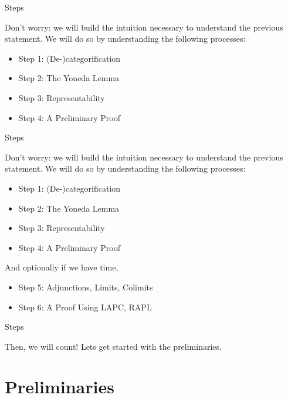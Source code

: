 \documentclass[tikz]{beamer}
\theoremstyle{definition}
\begin{document}
\begin{frame}{Steps}
    
    Don't worry: we will build the intuition necessary to understand the 
    previous statement. We will do so by understanding the following processes:
    
\begin{itemize}
    \item Step 1: (De-)categorification
    \item Step 2: The Yoneda Lemma
    \item Step 3: Representability
    \item Step 4: A Preliminary Proof
\end{itemize}

\end{frame}
\begin{frame}{Steps}
    
    Don't worry: we will build the intuition necessary to understand the 
    previous statement. We will do so by understanding the following processes:
    
\begin{itemize}
    \item Step 1: (De-)categorification
    \item Step 2: The Yoneda Lemma
    \item Step 3: Representability
    \item Step 4: A Preliminary Proof
\end{itemize}
    
And optionally if we have time, 
\begin{itemize}
    \item Step 5: Adjunctions, Limits, Colimits
    \item Step 6: A Proof Using LAPC, RAPL
\end{itemize}
\end{frame}

\begin{frame}{Steps}
    
    Then, we will count! Lets get started with the preliminaries.
\end{frame}

\section{Preliminaries}
\end{document}
